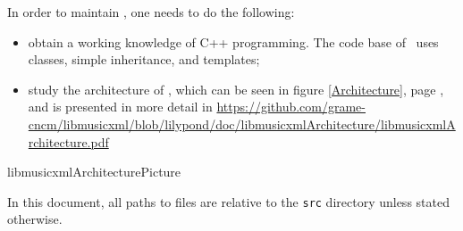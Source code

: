 In order to maintain \lib, one needs to do the following:
\begin{itemize}
\item obtain a working knowledge of C++ programming. The code base of \lib\ uses classes, simple inheritance, and templates;


\item study the architecture of \lib, which can be seen in figure \ref {Architecture}, page \pageref {Architecture}, and is presented in more detail in \url{https://github.com/grame-cncm/libmusicxml/blob/lilypond/doc/libmusicxmlArchitecture/libmusicxmlArchitecture.pdf}
\end{itemize}

{libmusicxmlArchitecturePicture}

In this document, all paths to files are relative to the {\tt src} directory unless stated otherwise.
